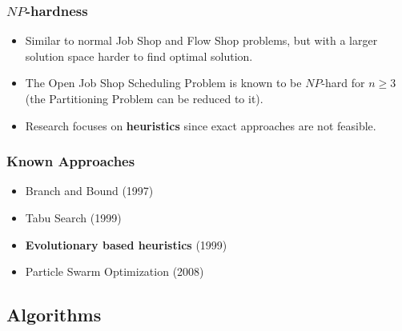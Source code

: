 \begin{frame}
	\frametitle{$NP$-hardness}
	
	\begin{itemize}
	
		\item Similar to normal Job Shop and Flow Shop problems, but with a larger solution space \textrightarrow \hspace{.5em} harder to find optimal solution.

		\item 	The Open Job Shop Scheduling Problem is known to be $NP$-hard for $n \geq 3$ (the Partitioning Problem can be reduced to it).

		\item 	\textrightarrow \hspace{.5em} Research focuses on \textbf{heuristics} since exact approaches are not feasible.
	\end{itemize}
	
	
\end{frame}


\begin{frame}
	\frametitle{Known Approaches}
	\begin{itemize}
	
		\item Branch and Bound (1997)

		\item 	Tabu Search (1999)

		\item 	\textbf{Evolutionary based heuristics} (1999)

		\item 	Particle Swarm Optimization (2008)
	\end{itemize}
	
	
\end{frame}


\subsection{Algorithms}


